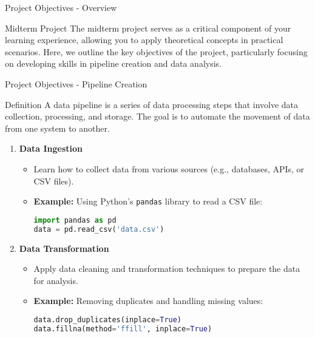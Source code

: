 \documentclass[aspectratio=169]{beamer}
\begin{document}
\begin{frame}[fragile]{Project Objectives - Overview}
    \begin{block}{Midterm Project}
        The midterm project serves as a critical component of your learning experience, allowing you to apply theoretical concepts in practical scenarios. 
        Here, we outline the key objectives of the project, particularly focusing on developing skills in pipeline creation and data analysis.
    \end{block}
\end{frame}

\begin{frame}[fragile]{Project Objectives - Pipeline Creation}
    \begin{block}{Definition} 
        A data pipeline is a series of data processing steps that involve data collection, processing, and storage. The goal is to automate the movement of data from one system to another.
    \end{block}

    \begin{enumerate}
        \item \textbf{Data Ingestion}
        \begin{itemize}
            \item Learn how to collect data from various sources (e.g., databases, APIs, or CSV files).
            \item \textbf{Example:} Using Python’s \texttt{pandas} library to read a CSV file:
            \begin{lstlisting}[language=Python]
import pandas as pd
data = pd.read_csv('data.csv')
            \end{lstlisting}
        \end{itemize}
        
        \item \textbf{Data Transformation}
        \begin{itemize}
            \item Apply data cleaning and transformation techniques to prepare the data for analysis.
            \item \textbf{Example:} Removing duplicates and handling missing values:
            \begin{lstlisting}[language=Python]
data.drop_duplicates(inplace=True)
data.fillna(method='ffill', inplace=True)
            \end{lstlisting}
        \end{itemize}
        

\end{enumerate}
\end{frame}
\end{document}

